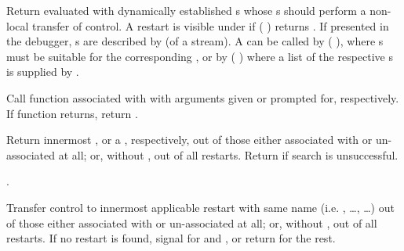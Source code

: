 \begin{LIST}{1cm}
  {
    Return  evaluated with dynamically
    established s whose s should
    perform a non-local transfer of control.  A restart is visible
    under  if ( )
    returns \T.  If presented in the debugger, s are
    described by  (of a stream).  A
     can be called by ( 
    ), where s must be suitable for the
    corresponding , or by
    ( ) where a list of
    the respective s is supplied by .
  }

  {
    Call function associated with  with arguments given
    or prompted for, respectively. If  function returns,
    return .
  }

  {
    Return innermost  , or a , respectively, out of those either associated with
     or un-associated at all; or, without
    , out of all restarts. Return \retval{\NIL} if
    search is unsuccessful.
  }

  {
    .
  }

  {
    Transfer control to innermost applicable restart with same name
    (i.e. , \ldots,  \ldots) out of those either associated
    with  or un-associated at all; or, without
    , out of all restarts. If no restart is found,
    signal  for  and ,
    or return \retval{\NIL} for the rest.
  }


\end{LIST}

